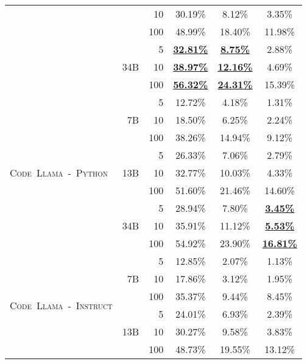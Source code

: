 \documentclass[10pt]{article}
\newcommand{\instmodel}{\textsc{Code~Llama~-~Instruct}\xspace}
\newcommand{\pymodel}{\textsc{Code~Llama~-~Python}\xspace}
\newcommand*{\acc}[1]{\num[round-mode=places,round-precision=1]{#1}\%}
\begin{document}
\begin{table}[t!]
\begin{tabular}{lrr|ccc}
    &                      & 10    & \acc{30.19} & \acc{8.12} & \acc{3.35} \\
    &                      & 100   & \acc{48.99} & \acc{18.40} & \acc{11.98} \\
    \cmidrule{2-6}
    & \multirow{3}{*}{34B} & 5     & \bf{\underline{\acc{32.81}}} & \bf{\underline{\acc{8.75}}} & \acc{2.88} \\
    &                      & 10    & \bf{\underline{\acc{38.97}}} & \bf{\underline{\acc{12.16}}} & \acc{4.69} \\
    &                      & 100   & \bf{\underline{\acc{56.32}}} & \bf{\underline{\acc{24.31}}} & \acc{15.39} \\
    \midrule
\multirow{9}{*}{\pymodel} 
    & \multirow{3}{*}{7B}   & 5     & \acc{12.72} & \acc{4.18} & \acc{1.31} \\
    &                      & 10    & \acc{18.50} & \acc{6.25} & \acc{2.24} \\
    &                      & 100   & \acc{38.26} & \acc{14.94} & \acc{9.12} \\
    \cmidrule{2-6}
    & \multirow{3}{*}{13B} & 5     & \acc{26.33} & \acc{7.06} & \acc{2.79} \\
    &                      & 10    & \acc{32.77} & \acc{10.03} & \acc{4.33} \\
    &                      & 100   & \acc{51.60} & \acc{21.46} & \acc{14.60} \\
    \cmidrule{2-6}
    & \multirow{3}{*}{34B} & 5     & \acc{28.94} & \acc{7.80} & \bf{\underline{\acc{3.45}}} \\
    &                      & 10    & \acc{35.91} & \acc{11.12} & \bf{\underline{\acc{5.53}}} \\
    &                      & 100   & \acc{54.92} & \acc{23.90} & \bf{\underline{\acc{16.81}}} \\
    \midrule
\multirow{9}{*}{\instmodel} 
    & \multirow{3}{*}{7B} & 5     & \acc{12.85} & \acc{2.07} & \acc{1.13} \\
    &                      & 10    & \acc{17.86} & \acc{3.12} & \acc{1.95} \\
    &                      & 100   & \acc{35.37} & \acc{9.44} & \acc{8.45} \\
    \cmidrule{2-6}
    & \multirow{3}{*}{13B} & 5     & \acc{24.01} & \acc{6.93} & \acc{2.39} \\
    &                      & 10    & \acc{30.27} & \acc{9.58} & \acc{3.83} \\
    &                      & 100   & \acc{48.73} & \acc{19.55} & \acc{13.12} \\

\end{tabular}
\end{table}
\end{document}
